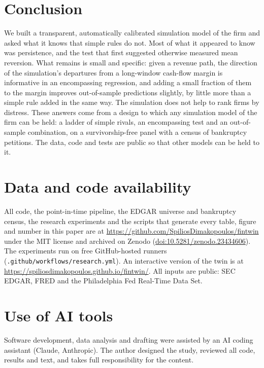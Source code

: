 \documentclass[11pt]{article}
\begin{document}
\section{Conclusion}\label{sec:conclusion}
We built a transparent, automatically calibrated simulation model of the firm and asked what it knows that simple rules do not. Most of what it appeared to know was persistence, and the test that first suggested otherwise measured mean reversion. What remains is small and specific: given a revenue path, the direction of the simulation's departures from a long-window cash-flow margin is informative in an encompassing regression, and adding a small fraction of them to the margin improves out-of-sample predictions slightly, by little more than a simple rule added in the same way. The simulation does not help to rank firms by distress. These answers come from a design to which any simulation model of the firm can be held: a ladder of simple rivals, an encompassing test and an out-of-sample combination, on a survivorship-free panel with a census of bankruptcy petitions. The data, code and tests are public so that other models can be held to it.

\section*{Data and code availability}
All code, the point-in-time pipeline, the EDGAR universe and bankruptcy census, the research experiments and the scripts that generate every table, figure and number in this paper are at \url{https://github.com/SpiliosDimakopoulos/fintwin} under the MIT license and archived on Zenodo (\href{https://doi.org/10.5281/zenodo.23434606}{doi:10.5281/zenodo.23434606}). The experiments run on free GitHub-hosted runners (\texttt{.github/workflows/research.yml}). An interactive version of the twin is at \url{https://spiliosdimakopoulos.github.io/fintwin/}. All inputs are public: SEC EDGAR, FRED and the Philadelphia Fed Real-Time Data Set.

\section*{Use of AI tools}
Software development, data analysis and drafting were assisted by an AI coding assistant (Claude, Anthropic). The author designed the study, reviewed all code, results and text, and takes full responsibility for the content.



\end{document}
